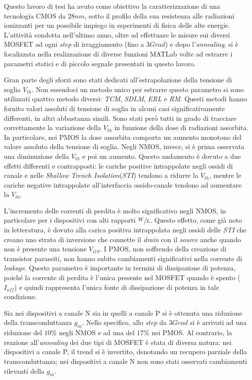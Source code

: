 Questo lavoro di tesi ha avuto come obiettivo la caratterizzazione di una tecnologia CMOS da $28nm$, sotto il profilo della sua resistenza alle radiazioni ionizzanti per un possibile impiego in esperimenti di fisica delle alte energie. L'attività condotta nell'ultimo anno, oltre ad effettuare le misure sui diversi MOSFET ad ogni \emph{step} di irraggiamento (fino a $3Grad$) e dopo l'\textit{annealing}, si è focalizzata nella realizzazione di diverse funzioni MATLab volte ad estrarre i parametri statici e di piccolo segnale presentati in questo lavoro.

Gran parte degli sforzi sono stati dedicati all'estrapolazione della tensione di soglia $V_{th}$. Non essendoci un metodo unico per estrarre questo parametro si sono utilizzati quattro metodo diversi: \textit{TCM}, \textit{SDLM}, \textit{ERL} e \textit{RM}. Questi metodi hanno fornito valori assoluti di tensione di soglia in alcuni casi significativamente differenti, in altri abbastanza simili. Sono stati però tutti in grado di tracciare correttamente la variazione della $V_{th}$ in funzione della dose di radiazioni assorbita. In particolare, nei PMOS la dose assorbita comporta un aumento monotono del valore assoluto della tensione di soglia. Negli NMOS, invece, si è prima osservata una diminuzione della $V_{th}$ e poi un aumento. Questo andamento è dovuto a due effetti differenti e contrapposti: le cariche positive intrappolate negli ossidi di canale e nelle \emph{Shallow Trench Isolation}(\emph{STI}) tendono a ridurre la $V_{th}$, mentre le cariche negative intrappolate all'interfaccia ossido-canale tendono ad aumentare la $V_{th}$.

L'incremento delle correnti di perdita è molto significativo negli NMOS, in particolare per i dispositivi con alti rapporti $\sfrac{W}{L}$. Questo effetto, come già noto in letteratura, è dovuto alla carica positiva intrappolata negli ossidi delle \emph{STI} che creano uno strato di inversione che connette il \emph{drain} con il \emph{source} anche quando non è presente una tensione $V_{GS}$. I PMOS, non soffrendo della creazione di transistor parassiti, non hanno subito cambiamenti significativi nella corrente di \emph{leakage}. Questo parametro è importante in termini di dissipazione di potenza, poiché la corrente di perdita è l'unica presente nel MOSFET quando è spento ($I_{off}$) e quindi rappresenta l'unica fonte di dissipazione di potenza in tale condizione.   

Sia nei dispositivi a canale N sia in quelli a canale P si è ottenuta una riduzione della transconduttanza $g_m$. Nello specifico, allo \emph{step} da $3Grad$ si è arrivati ad una riduzione del $10\%$ negli NMOS e ad una del $17\%$ nei PMOS. Al contrario, la reazione all'\textit{annealing} dei due tipi di MOSFET è stata di diversa natura: nei dispositivi a canale P, il trend si è invertito, denotando un recupero parziale della transconduttanza; nei dispositivi a canale N non sono stati osservati cambiamenti rilevanti della $g_m$.    

   